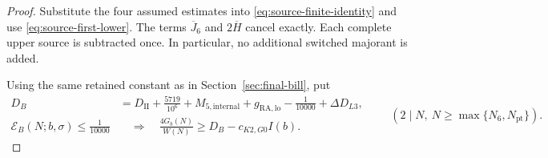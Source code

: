 \begin{proof}
Substitute the four assumed estimates into
\eqref{eq:source-finite-identity} and use \eqref{eq:source-first-lower}.
The terms \(\overline J_6\) and \(2\overline H\) cancel exactly.
Each complete upper source is subtracted once.
In particular, no additional switched majorant is added.

Using the same retained constant as in Section~\ref{sec:final-bill}, put
\begin{equation}\label{eq:source-trackb-floor}
\begin{aligned}
 D_B&=D_{\mathrm{II}}+\frac{5719}{10^6}
      +M_{5,\mathrm{internal}}+g_{\mathrm{RA,lo}}
      -\frac1{10000}+\Delta D_{L3},\\
 \mathcal E_B(N;b,\sigma)\le\frac1{10000}
 &\quad\Longrightarrow\quad
 \frac{4G_b(N)}{W(N)}\ge D_B-c_{K2,G0}I(b).
\end{aligned}
\qquad(2\mid N,\ N\ge\max\{N_6,N_{\mathrm{pt}}\}).
\end{equation}
\end{proof}
